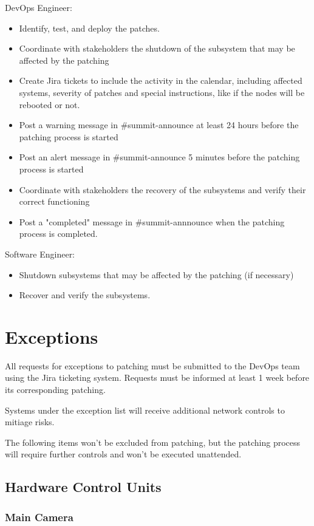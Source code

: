 DevOps Engineer:
\begin{itemize}
    \item Identify, test, and deploy the patches. 
    \item Coordinate with stakeholders the shutdown of the subsystem that may be affected by the patching
    \item Create Jira tickets to include the activity in the calendar, including affected systems, severity of patches and special instructions, like if the nodes will be rebooted or not. 
    \item Post a warning message in \#summit-announce at least 24 hours before the patching process is started
    \item Post an alert message in \#summit-announce 5 minutes before the patching process is started
    \item Coordinate with stakeholders the recovery of the subsystems and verify their correct functioning 
    \item Post a "completed" message in \#summit-annnounce when the patching process is completed. 
\end{itemize}

Software Engineer:
\begin{itemize}
    \item Shutdown subsystems that may be affected by the patching (if necessary)
    \item Recover and verify the subsystems. 
\end{itemize}

\section{Exceptions}

All requests for exceptions to patching must be submitted to the DevOps team using the Jira ticketing system. Requests must be informed at least 1 week before its corresponding patching. 

Systems under the exception list will receive additional network controls to mitiage risks. 

The following items won't be excluded from patching, but the patching process will require further controls and won't be executed unattended. 

\subsection{Hardware Control Units}

\subsubsection{Main Camera}

